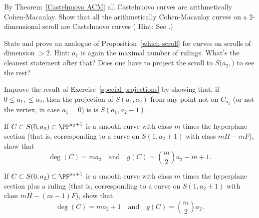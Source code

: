 \begin{exercise}\label{Castelnuovo scrolls}
By Theorem~\ref{Castelnuovo ACM} all Castelnuovo curves are arithmetically Cohen-Macaulay.
Show that all the arithmetically Cohen-Macaulay curves on a 2-dimensional scroll are
Castelnuovo curves ( Hint: See \cite[Section 3c]{MR685427}.)
\end{exercise}


\begin{exercise}
State and prove an analogue of Proposition~\ref{which scroll} for curves on scrolls of dimension $>2$.
Hint: $a_1$ is again the maximal number of rulings. What's the cleanest statement after that? Does one have
to project the scroll to $S(a_2, \dot)$ to see the rest?
\end{exercise}


\begin{exercise}\label{general projections}
Improve the result of Exercise~\ref{special projections} by showing that, if $0\leq a_1,\leq a_2$, then
 the projection of $S(a_1,a_2)$ from any point not on $C_{a_1}$ (or not the vertex, in case $a_1=0$) is 
 is $S(a_1, a_2-1)$.
\end{exercise}


\begin{exercise}\label{curves on cones}
\item If $C \subset S(0, a_2) \subset \PP^{a_2+1}$ is a smooth curve with class $m$ times the hyperplane section (that is, corresponding to a curve on $S(1,a_2+1)$ with class $mH - mF$), show that
$$
\deg(C) = ma_2 \quad \text{and} \quad g(C) = \binom{m}{2}a_2 - m + 1.
$$
\item If $C \subset S(0, a_2) \subset \PP^{a_2+1}$ is a smooth curve with class $m$ times the hyperplane section plus a ruling (that is, corresponding to a curve on $S(1,a_2+1)$ with class $mH - (m-1)F$), show that
$$
\deg(C) = ma_2 + 1 \quad \text{and} \quad g(C) = \binom{m}{2}a_2.
$$
\end{exercise}


